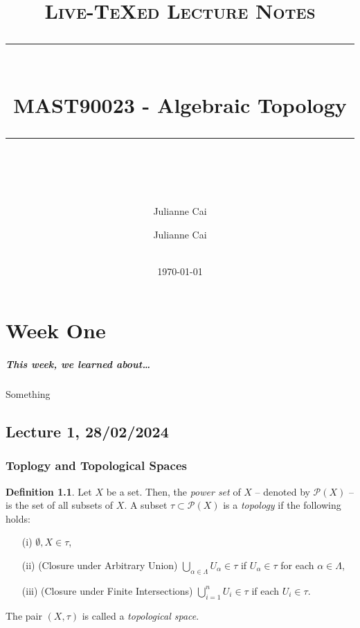 \documentclass[a4paper]{report}
\author{
  Julianne Cai\\
}
\title{}
\date{\today}
\theoremstyle{definition}
\newtheorem{definition}{Definition}
\theoremstyle{remark}
\theoremstyle{proposition}
\theoremstyle{conjecture}
\theoremstyle{lemma}
\theoremstyle{corollary}
\theoremstyle{exercise}
\newcommand{\mcal}{\mathcal}
\newcommand{\HRule}[1]{\rule{\linewidth}{#1}}
\begin{document}
\title{ \normalsize \textsc{Live-TeXed Lecture Notes}
		\\ [2.0cm]
		\HRule{0.5pt} \\
		\LARGE \textbf{MAST90023 - Algebraic Topology}
		\HRule{2pt} \\ [0.5cm]
        }

\date{}
\author{
		Julianne Cai \\\\
        }
\maketitle
\newpage

\tableofcontents
\newpage

\chapter{Week One}

\paragraph{This week, we learned about\ldots} Something

\section{Lecture 1, 28/02/2024}

\subsection{Toplogy and Topological Spaces}

\begin{definition}
    Let $X$ be a set. Then, the \emph{power set} of $X$ -- denoted by 
    $\mcal{P}(X)$ -- is the set of all subsets of $X$.
    A subset $\tau \subset \mcal{P}(X)$ is a \emph{topology} if the following
    holds:
    \begin{itemize}
        \item[(i)] $\emptyset, X \in \tau$,
        \item[(ii)] (Closure under Arbitrary Union) $\bigcup_{\alpha \in \Lambda} U_\alpha \in \tau$ if 
            $U_\alpha \in \tau$ for each $\alpha \in \Lambda$,
        \item[(iii)] (Closure under Finite Intersections) 
            $\bigcup_{i=1}^n U_i \in \tau$ if each $U_i \in \tau$.
    \end{itemize}
    The pair $(X,\tau)$ is called a \emph{topological space}.
\end{definition}
\end{document}
